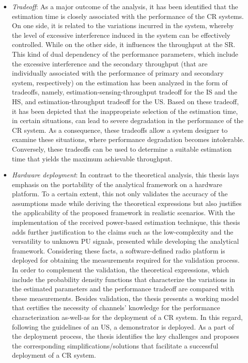 \begin{itemize}
\item \textit{Tradeoff}: 
As a major outcome of the analysis, it has been identified that the estimation time is closely associated with the performance of the CR systems. On one side, it is related to the variations incurred in the system, whereby the level of excessive interference induced in the system can be effectively controlled. While on the other side, it influences the throughput at the SR. This kind of dual dependency of the performance parameters, which include the excessive interference and the secondary throughput (that are individually associated with the performance of primary and secondary system, respectively) on the estimation has been analyzed in the form of tradeoffs, namely, estimation-sensing-throughput tradeoff for the IS and the HS, and estimation-throughput tradeoff for the US. Based on these tradeoff, it has been depicted that the inappropriate selection of the estimation time, in certain situations, can lead to severe degradation in the performance of the CR system. As a consequence, these tradeoffs allow a system designer to examine these situations, where performance degradation becomes intolerable. Conversely, these tradeoffs can be used to determine a suitable estimation time that yields the maximum achievable throughput.
 
 
\item \textit{Hardware deployment}: 
In contrast to the theoretical analysis, this thesis lays emphasis on the portability of the analytical framework on a hardware platform. To a certain extent, this not only validates the accuracy of the assumptions made while deriving the theoretical expressions but also justifies the applicability of the proposed framework in realistic scenarios. With the implementation of the received power-based estimation technique, this thesis adds further justification to the claims such as the low-complexity and the versatility to unknown PU signals, presented while developing the analytical framework. Considering these facts, a software-defined radio platform is deployed for obtaining the measurements required for the validation process. In order to complement the validation, the theoretical expressions, which include the probability density functions that characterize the variations in the estimated parameters and the performance tradeoff are compared with these measurements. Besides validation, the thesis presents a working model that certifies the necessity of channels' knowledge for the performance characterization as-well-as for the deployment of a CR system. In this regard, following the guidelines of an US, a demonstrator is deployed. As a part of the deployment process, %
the thesis identifies the key challenges and proposes the corresponding simplifications/solutions that facilitate a successful deployment of a CR system.  
\end{itemize}

